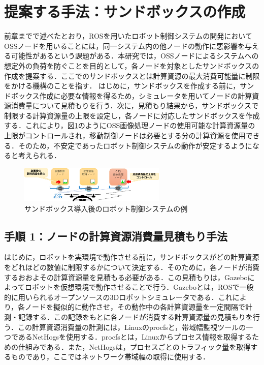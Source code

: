 \documentclass[11pt]{ujarticle} %
\begin{document}
\section{提案する手法：サンドボックスの作成}
前章までで述べたとおり，ROSを用いたロボット制御システムの開発においてOSSノードを用いることには，同一システム内の他ノードの動作に悪影響を与える可能性があるという課題がある．本研究では，OSSノードによるシステムへの想定外の負荷を防ぐことを目的として，各ノードを対象としたサンドボックスの作成を提案する．ここでのサンドボックスとは計算資源の最大消費可能量に制限をかける機構のことを指す．
はじめに，サンドボックスを作成する前に，サンドボックス作成に必要な情報を得るため，シミュレータを用いてノードの計算資源消費量について見積もりを行う．次に，見積もり結果から，サンドボックスで制限する計算資源量の上限を設定し，各ノードに対応したサンドボックスを作成する．これにより，図\ref{fig:after}のようにOSS画像処理ノードの使用可能な計算資源量の上限がコントロールされ，移動制御ノードは必要とする分の計算資源を使用できる．そのため，不安定であったロボット制御システムの動作が安定するようになると考えられる．

\begin{figure}[h]
   \centering
   \includegraphics[width=7cm]{img/after.pdf}
   \caption{サンドボックス導入後のロボット制御システムの例}
   \label{fig:after}
\end{figure}

\subsection{手順 1：ノードの計算資源消費量見積もり手法}
はじめに，ロボットを実環境で動作させる前に，サンドボックスがどの計算資源をどれほどの数値に制限するかについて決定する．そのために，各ノードが消費するおおよその計算資源量を見積もる必要がある．この見積もりは，Gazebo\cite{Gazebo}によってロボットを仮想環境で動作させることで行う．Gazeboとは，ROSで一般的に用いられるオープンソースの3Dロボットシミュレータである．これにより，各ノードを擬似的に動作させ，その動作中の各計算資源量を一定間隔で計測・記録する．この記録をもとに各ノードが消費する計算資源量の見積もりを行う．この計算資源消費量の計測には，Linuxのprocfsと，帯域幅監視ツールの一つであるNetHogsを使用する．procfsとは，Linuxからプロセス情報を取得するための仕組みである\cite{procMan}．また，NetHogsは，プロセスごとのトラフィック量を取得するものであり，ここではネットワーク帯域幅の取得に使用する．
\end{document}
